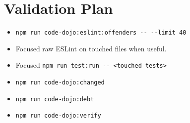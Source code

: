 \section{Validation Plan}\label{record-242-validation-plan}

\begin{itemize}
\tightlist
\item
  \texttt{n\allowbreak{}p\allowbreak{}m\allowbreak{} \allowbreak{}r\allowbreak{}u\allowbreak{}n\allowbreak{} \allowbreak{}c\allowbreak{}o\allowbreak{}d\allowbreak{}e\allowbreak{}-\allowbreak{}d\allowbreak{}o\allowbreak{}j\allowbreak{}o\allowbreak{}:\allowbreak{}e\allowbreak{}s\allowbreak{}l\allowbreak{}i\allowbreak{}n\allowbreak{}t\allowbreak{}:\allowbreak{}o\allowbreak{}f\allowbreak{}f\allowbreak{}e\allowbreak{}n\allowbreak{}d\allowbreak{}e\allowbreak{}r\allowbreak{}s\allowbreak{} \allowbreak{}-\allowbreak{}-\allowbreak{} \allowbreak{}-\allowbreak{}-\allowbreak{}l\allowbreak{}i\allowbreak{}m\allowbreak{}i\allowbreak{}t\allowbreak{} \allowbreak{}4\allowbreak{}0}
\item
  Focused raw ESLint on touched files when useful.
\item
  Focused \texttt{n\allowbreak{}p\allowbreak{}m\allowbreak{} \allowbreak{}r\allowbreak{}u\allowbreak{}n\allowbreak{} \allowbreak{}t\allowbreak{}e\allowbreak{}s\allowbreak{}t\allowbreak{}:\allowbreak{}r\allowbreak{}u\allowbreak{}n\allowbreak{} \allowbreak{}-\allowbreak{}-\allowbreak{} \allowbreak{}<\allowbreak{}t\allowbreak{}o\allowbreak{}u\allowbreak{}c\allowbreak{}h\allowbreak{}e\allowbreak{}d\allowbreak{} \allowbreak{}t\allowbreak{}e\allowbreak{}s\allowbreak{}t\allowbreak{}s\allowbreak{}>}
\item
  \texttt{n\allowbreak{}p\allowbreak{}m\allowbreak{} \allowbreak{}r\allowbreak{}u\allowbreak{}n\allowbreak{} \allowbreak{}c\allowbreak{}o\allowbreak{}d\allowbreak{}e\allowbreak{}-\allowbreak{}d\allowbreak{}o\allowbreak{}j\allowbreak{}o\allowbreak{}:\allowbreak{}c\allowbreak{}h\allowbreak{}a\allowbreak{}n\allowbreak{}g\allowbreak{}e\allowbreak{}d}
\item
  \texttt{n\allowbreak{}p\allowbreak{}m\allowbreak{} \allowbreak{}r\allowbreak{}u\allowbreak{}n\allowbreak{} \allowbreak{}c\allowbreak{}o\allowbreak{}d\allowbreak{}e\allowbreak{}-\allowbreak{}d\allowbreak{}o\allowbreak{}j\allowbreak{}o\allowbreak{}:\allowbreak{}d\allowbreak{}e\allowbreak{}b\allowbreak{}t}
\item
  \texttt{n\allowbreak{}p\allowbreak{}m\allowbreak{} \allowbreak{}r\allowbreak{}u\allowbreak{}n\allowbreak{} \allowbreak{}c\allowbreak{}o\allowbreak{}d\allowbreak{}e\allowbreak{}-\allowbreak{}d\allowbreak{}o\allowbreak{}j\allowbreak{}o\allowbreak{}:\allowbreak{}v\allowbreak{}e\allowbreak{}r\allowbreak{}i\allowbreak{}f\allowbreak{}y}

\end{itemize}
